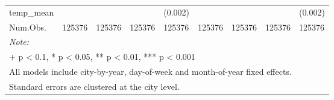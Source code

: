 \begin{landscape}
\begin{table}
{\begin{tabular}[t]{lllllllll}
\multirow{-2}{*}{\raggedright\arraybackslash temp_{mean}} &  &  &  & (0.002) &  &  &  & (0.002)\\

Num.Obs. & 125376 & 125376 & 125376 & 125376 & 125376 & 125376 & 125376 & 125376\\
\bottomrule
\multicolumn{9}{l}{\rule{0pt}{1em}\textit{Note: }}\\
\multicolumn{9}{l}{\rule{0pt}{1em}+ p < 0.1, * p < 0.05, ** p < 0.01, *** p < 0.001}\\
\multicolumn{9}{l}{\rule{0pt}{1em}All models include city-by-year, day-of-week and month-of-year fixed effects.}\\
\multicolumn{9}{l}{\rule{0pt}{1em}Standard errors are clustered at the city level.}\\
\end{tabular}}
\end{table}
\end{landscape}
